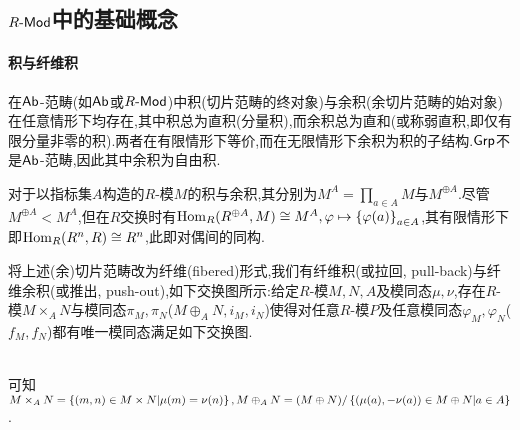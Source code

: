 \documentclass[11pt]{article} %
\begin{document}
\subsection{$R\textrm{-}\mathsf{Mod}$中的基础概念}
\paragraph{积与纤维积}
在$\mathsf{Ab}$-范畴(如$\mathsf{Ab}$或$R\textrm{-}\mathsf{Mod}$)中积(切片范畴的终对象)与余积(余切片范畴的始对象)在任意情形下均存在,其中积总为直积(分量积),而余积总为直和(或称弱直积,即仅有限分量非零的积).两者在有限情形下等价,而在无限情形下余积为积的子结构.$\mathsf{Grp}$不是$\mathsf{Ab}$-范畴,因此其中余积为自由积.

对于以指标集$A$构造的$R$-模$M$的积与余积,其分别为$M^A=\prod_{a\in A}M$与$M^{\oplus A}$.尽管$M^{\oplus A}<M^A$,但在$R$交换时有$\operatorname{Hom}_{R}(R^{\oplus A},M)\cong M^A, \varphi\mapsto \left\{\varphi(a)\right\}_{a\in A}$,其有限情形下即$\operatorname{Hom}_R(R^n,R)\cong R^n$,此即对偶间的同构.

将上述(余)切片范畴改为纤维(fibered)形式,我们有纤维积(或拉回, pull-back)与纤维余积(或推出, push-out),如下交换图所示:给定$R$-模$M,N,A$及模同态$\mu,\nu$,存在$R$-模$M\times_A N$与模同态$\pi_M, \pi_N$($M\oplus_A N, i_M, i_N$)使得对任意$R$-模$P$及任意模同态$\varphi_M, \varphi_N$($f_M, f_N$)都有唯一模同态满足如下交换图.

\\可知$M\times_A N=\left\{(m,n)\in M\times N | \mu(m)=\nu(n)\right\}, M\oplus_A N=(M\oplus N)/\left\{(\mu(a),-\nu(a))\in M\oplus N | a\in A\right\}$.
\end{document}
